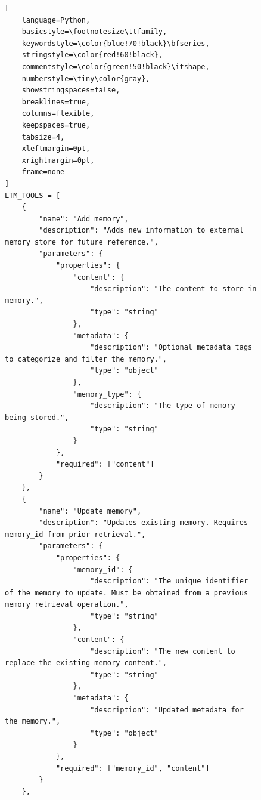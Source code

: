 \begin{figure}[p]
\centering
\begin{tcolorbox}[
    enhanced,
    colback=green!3!white,
    colframe=green!40!black,
    fonttitle=\bfseries\sffamily,
    title={\small Long-term Memory (LTM) Management Tools},
    coltitle=white,
    attach boxed title to top left={yshift=-2mm, xshift=3mm},
    boxed title style={colback=green!40!black, sharp corners},
    sharp corners,
    boxrule=0.5pt,
    left=3pt,
    right=3pt,
    top=8pt,
    bottom=3pt,
    arc=0pt
]
\begin{lstlisting}[
    language=Python,
    basicstyle=\footnotesize\ttfamily,
    keywordstyle=\color{blue!70!black}\bfseries,
    stringstyle=\color{red!60!black},
    commentstyle=\color{green!50!black}\itshape,
    numberstyle=\tiny\color{gray},
    showstringspaces=false,
    breaklines=true,
    columns=flexible,
    keepspaces=true,
    tabsize=4,
    xleftmargin=0pt,
    xrightmargin=0pt,
    frame=none
]
LTM_TOOLS = [
    {
        "name": "Add_memory",
        "description": "Adds new information to external memory store for future reference.",
        "parameters": {
            "properties": {
                "content": {
                    "description": "The content to store in memory.",
                    "type": "string"
                },
                "metadata": {
                    "description": "Optional metadata tags to categorize and filter the memory.",
                    "type": "object"
                },
                "memory_type": {
                    "description": "The type of memory being stored.",
                    "type": "string"
                }
            },
            "required": ["content"]
        }
    },
    {
        "name": "Update_memory",
        "description": "Updates existing memory. Requires memory_id from prior retrieval.",
        "parameters": {
            "properties": {
                "memory_id": {
                    "description": "The unique identifier of the memory to update. Must be obtained from a previous memory retrieval operation.",
                    "type": "string"
                },
                "content": {
                    "description": "The new content to replace the existing memory content.",
                    "type": "string"
                },
                "metadata": {
                    "description": "Updated metadata for the memory.",
                    "type": "object"
                }
            },
            "required": ["memory_id", "content"]
        }
    },

\end{lstlisting}
\end{tcolorbox}
\end{figure}
